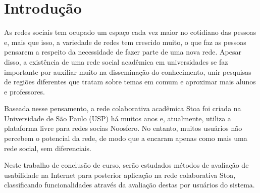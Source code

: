 \chapter{Introdução}
\label{cap:introducao}

    As redes sociais tem ocupado um espaço cada vez maior no cotidiano das pessoas e, mais que isso, a variedade de redes tem crescido muito, o que faz as pessoas pensarem a respeito da necessidade de fazer parte de uma nova rede. Apesar disso, a existência de uma rede social acadêmica em universidades se faz importante por auxiliar muito na disseminação do conhecimento, unir pesquisas de regiões diferentes que tratam sobre temas em comum e aproximar mais alunos e professores. 
    
    Baseada nesse pensamento, a rede colaborativa acadêmica Stoa foi criada na Universidade de São Paulo (USP) há muitos anos e, atualmente, utiliza a plataforma livre para redes socias Noosfero. No entanto, muitos usuários não percebem o potencial da rede, de modo que a encaram apenas como mais uma rede social, sem diferenciais.
    
    

    Neste trabalho de conclusão de curso, serão estudados métodos de avaliação de usabilidade na Internet para posterior aplicação na rede colaborativa Stoa, classificando funcionalidades através da avaliação destas por usuários do sistema.



